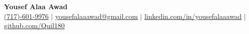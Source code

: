 \documentclass[letterpaper,10pt]{article}
\begin{document}
\begin{center}
    \textbf{\Huge Yousef Alaa Awad} \\ \vspace{1pt}
		\small \href{tel:17176019976}{\underline{(717)-601-9976}} $|$
    \small \href{mailto:yousefalaaawad@gmail.com}{\underline{yousefalaaawad@gmail.com}} $|$ 
    \href{https://www.linkedin.com/in/yousefalaaawad}{\underline{linkedin.com/in/yousefalaaawad}} $|$
    \href{https://www.github.com/Quil180}{\underline{github.com/Quil180}}
\end{center}






\end{document}
